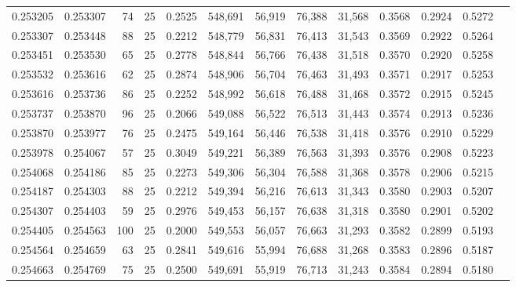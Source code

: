 \begin{tabular}{rrrrrrrrrrrrr}
0.253205 & 0.253307 &    74 &  25 &                                     0.2525 & 548,691 &  56,919 &  76,388 &  31,568 & 0.3568 & 0.2924 & 0.5272 \\
0.253307 & 0.253448 &    88 &  25 &                                     0.2212 & 548,779 &  56,831 &  76,413 &  31,543 & 0.3569 & 0.2922 & 0.5264 \\
0.253451 & 0.253530 &    65 &  25 &                                     0.2778 & 548,844 &  56,766 &  76,438 &  31,518 & 0.3570 & 0.2920 & 0.5258 \\
0.253532 & 0.253616 &    62 &  25 &                                     0.2874 & 548,906 &  56,704 &  76,463 &  31,493 & 0.3571 & 0.2917 & 0.5253 \\
0.253616 & 0.253736 &    86 &  25 &                                     0.2252 & 548,992 &  56,618 &  76,488 &  31,468 & 0.3572 & 0.2915 & 0.5245 \\
0.253737 & 0.253870 &    96 &  25 &                                     0.2066 & 549,088 &  56,522 &  76,513 &  31,443 & 0.3574 & 0.2913 & 0.5236 \\
0.253870 & 0.253977 &    76 &  25 &                                     0.2475 & 549,164 &  56,446 &  76,538 &  31,418 & 0.3576 & 0.2910 & 0.5229 \\
0.253978 & 0.254067 &    57 &  25 &                                     0.3049 & 549,221 &  56,389 &  76,563 &  31,393 & 0.3576 & 0.2908 & 0.5223 \\
0.254068 & 0.254186 &    85 &  25 &                                     0.2273 & 549,306 &  56,304 &  76,588 &  31,368 & 0.3578 & 0.2906 & 0.5215 \\
0.254187 & 0.254303 &    88 &  25 &                                     0.2212 & 549,394 &  56,216 &  76,613 &  31,343 & 0.3580 & 0.2903 & 0.5207 \\
0.254307 & 0.254403 &    59 &  25 &                                     0.2976 & 549,453 &  56,157 &  76,638 &  31,318 & 0.3580 & 0.2901 & 0.5202 \\
0.254405 & 0.254563 &   100 &  25 &                                     0.2000 & 549,553 &  56,057 &  76,663 &  31,293 & 0.3582 & 0.2899 & 0.5193 \\
0.254564 & 0.254659 &    63 &  25 &                                     0.2841 & 549,616 &  55,994 &  76,688 &  31,268 & 0.3583 & 0.2896 & 0.5187 \\
0.254663 & 0.254769 &    75 &  25 &                                     0.2500 & 549,691 &  55,919 &  76,713 &  31,243 & 0.3584 & 0.2894 & 0.5180 \\

\end{tabular}
